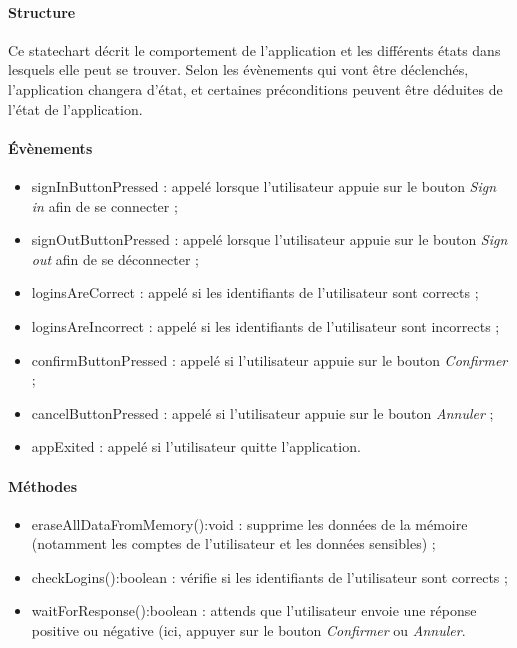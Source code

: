\paragraph{Structure} Ce statechart décrit le comportement de l'application et les différents états dans lesquels elle peut se trouver. Selon les évènements qui vont être déclenchés, l'application changera d'état, et certaines préconditions peuvent être déduites de l'état de l'application.

\paragraph{Évènements}
\begin{itemize}
\item signInButtonPressed : appelé lorsque l'utilisateur appuie sur le bouton \emph{Sign in} afin de se connecter ;
\item signOutButtonPressed : appelé lorsque l'utilisateur appuie sur le bouton \emph{Sign out} afin de se déconnecter ;
\item loginsAreCorrect : appelé si les identifiants de l'utilisateur sont corrects ;
\item loginsAreIncorrect : appelé si les identifiants de l'utilisateur sont incorrects ;
\item confirmButtonPressed : appelé si l'utilisateur appuie sur le bouton \emph{Confirmer} ;
\item cancelButtonPressed : appelé si l'utilisateur appuie sur le bouton \emph{Annuler} ;
\item appExited : appelé si l'utilisateur quitte l'application.
\end{itemize}

\paragraph{Méthodes}
\begin{itemize}
\item eraseAllDataFromMemory():void : supprime les données de la mémoire (notamment les comptes de l'utilisateur et les données sensibles) ;
\item checkLogins():boolean : vérifie si les identifiants de l'utilisateur sont corrects ;
\item waitForResponse():boolean : attends que l'utilisateur envoie une réponse positive ou négative (ici, appuyer sur le bouton \emph{Confirmer} ou \emph{Annuler}.
\end{itemize}

